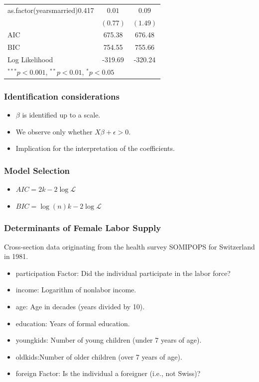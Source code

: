 \documentclass{beamer}
\newcommand{\Lik}{\mathcal{L}}
\newcommand{\1}{\mathbb{1}}
\begin{document}
\begin{frame}
\begin{table}[hb!]
\begin{center}
\begin{tabular}{l c c }
as.factor(yearsmarried)0.417 & $0.01$       & $0.09$       \\
                             & $(0.77)$     & $(1.49)$     \\
\midrule
AIC                          & 675.38       & 676.48       \\
BIC                          & 754.55       & 755.66       \\
Log Likelihood               & -319.69      & -320.24      \\
\bottomrule
\multicolumn{3}{l}{\scriptsize{$^{***}p<0.001$, $^{**}p<0.01$, $^*p<0.05$}}
\end{tabular}
\label{table:coefficients}
\end{center}
\end{table}

\end{frame}



\begin{frame}\frametitle{Identification considerations}
\begin{itemize}
\item $\beta$ is identified up to a scale. 
\item We observe only whether $X\beta + \epsilon > 0$. 
\item Implication for the interpretation of the coefficients. 
\end{itemize}
\end{frame}

\begin{frame}\frametitle{Model Selection}
\begin{itemize}
\item $AIC = 2k - 2 \log \Lik$ 
\item $BIC = \log(n) k - 2 \log \Lik $
\end{itemize}
\end{frame}


\begin{frame}\frametitle{Determinants of Female Labor Supply}
Cross-section data originating from the health survey SOMIPOPS for Switzerland in 1981.

\begin{itemize}
 \item participation Factor: Did the individual participate in the labor force?
 \item income: Logarithm of nonlabor income.
 \item age: Age in decades (years divided by 10).
\item education: Years of formal education.
\item youngkids: Number of young children (under 7 years of age).
\item oldkids:Number of older children (over 7 years of age).
\item foreign Factor: Is the individual a foreigner (i.e., not Swiss)?
\end{itemize}
\end{frame}
\end{document}
